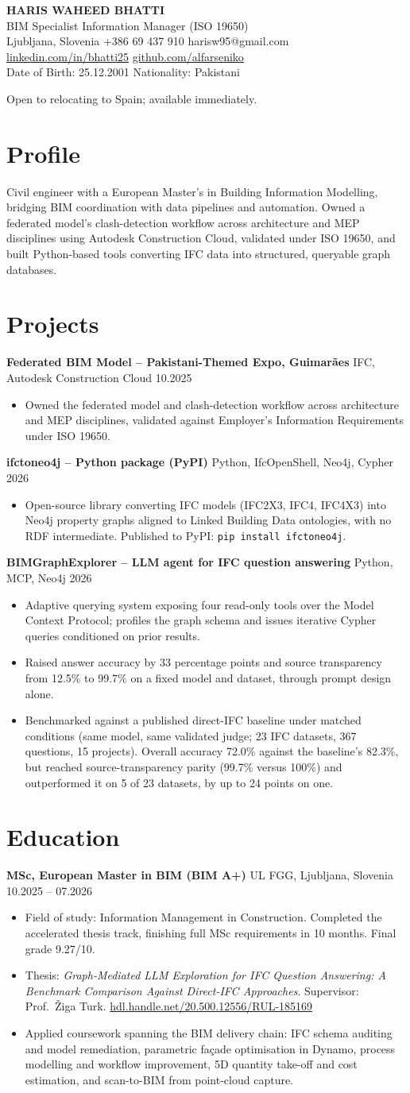 \documentclass[a4paper,10.5pt]{article}
\newcommand{\datefill}{\dotfill}
\newcommand{\entry}[3]{\vspace{2.5pt}\noindent\textbf{#1} \textbar{} #2 \datefill{} #3\par\vspace{0.5pt}}
\newcommand{\ROLELINE}{BIM Specialist \textbar{} Information Manager (ISO 19650)}
\newcommand{\projIfcToNeo}{%
\entry{ifctoneo4j -- Python package (PyPI)}{Python, IfcOpenShell, Neo4j, Cypher}{2026}
\begin{itemize}
  \item Open-source library converting IFC models (IFC2X3, IFC4, IFC4X3) into Neo4j
        property graphs aligned to Linked Building Data ontologies, with no RDF
        intermediate. Published to PyPI: \texttt{pip install ifctoneo4j}.
\end{itemize}}
\newcommand{\projBIMGraph}{%
\entry{BIMGraphExplorer -- LLM agent for IFC question answering}{Python, MCP, Neo4j}{2026}
\begin{itemize}
  \item Adaptive querying system exposing four read-only tools over the Model
        Context Protocol; profiles the graph schema and issues iterative Cypher
        queries conditioned on prior results.
  \item Raised answer accuracy by 33 percentage points and source transparency from
        12.5\% to 99.7\% on a fixed model and dataset, through prompt design alone.
  \item Benchmarked against a published direct-IFC baseline under matched
        conditions (same model, same validated judge; 23 IFC datasets, 367
        questions, 15 projects). Overall accuracy 72.0\% against the baseline's
        82.3\%, but reached source-transparency parity (99.7\% versus 100\%) and
        outperformed it on 5 of 23 datasets, by up to 24 points on one.
\end{itemize}}
\newcommand{\projGuimaraes}{%
\entry{Federated BIM Model -- Pakistani-Themed Expo, Guimar\~aes}{IFC, Autodesk Construction Cloud}{10.2025}
\begin{itemize}
  \item Owned the federated model and clash-detection workflow across architecture
        and MEP disciplines, validated against Employer's Information Requirements
        under ISO 19650.
\end{itemize}}
\begin{document}
\begin{center}
  {\LARGE\bfseries HARIS WAHEED BHATTI}\\[2pt]
  {\large \ROLELINE}\\[3pt]
  Ljubljana, Slovenia \textbar{} +386 69 437 910 \textbar{} harisw95@gmail.com\\
  \href{https://linkedin.com/in/bhatti25}{linkedin.com/in/bhatti25} \textbar{}
  \href{https://github.com/alfarseniko}{github.com/alfarseniko}\\
  Date of Birth: 25.12.2001 \textbar{} Nationality: Pakistani
\end{center}
\vspace{-4pt}
\noindent\small Open to relocating to Spain; available immediately.\normalsize

\section{Profile}

\noindent Civil engineer with a European Master's in Building Information Modelling,
bridging BIM coordination with data pipelines and automation. Owned a federated
model's clash-detection workflow across architecture and MEP disciplines using
Autodesk Construction Cloud, validated under ISO 19650, and built Python-based tools
converting IFC data into structured, queryable graph databases.

\section{Projects}

 \projGuimaraes \projIfcToNeo \projBIMGraph

\section{Education}
\entry{MSc, European Master in BIM (BIM A+)}{UL FGG, Ljubljana, Slovenia}{10.2025 -- 07.2026}
\begin{itemize}
  \item Field of study: Information Management in Construction. Completed the
        accelerated thesis track, finishing full MSc requirements in 10 months.
        Final grade 9.27/10.
  \item Thesis: \textit{Graph-Mediated LLM Exploration for IFC Question Answering:
        A Benchmark Comparison Against Direct-IFC Approaches}. Supervisor:
        Prof.~\v{Z}iga Turk. \href{http://hdl.handle.net/20.500.12556/RUL-185169}{hdl.handle.net/20.500.12556/RUL-185169}
  \item Applied coursework spanning the BIM delivery chain: IFC schema auditing and model remediation, parametric façade optimisation in Dynamo, process modelling and workflow improvement, 5D quantity take-off and cost estimation, and scan-to-BIM from point-cloud capture.
\end{itemize}
\end{document}
